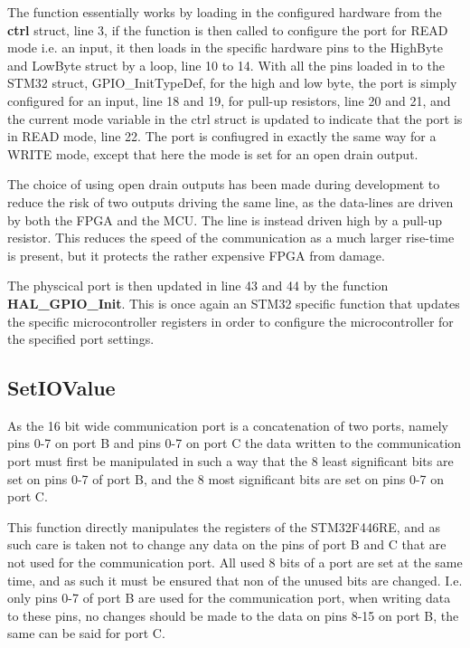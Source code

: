 The function essentially works by loading in the configured hardware from the \textbf{ctrl} struct, line 3, if the function is then called to configure the port for READ mode i.e. an input, it then loads in the specific hardware pins to the HighByte and LowByte struct by a loop, line 10 to 14. With all the pins loaded in to the STM32 struct, GPIO\_InitTypeDef, for the high and low byte, the port is simply configured for an input, line 18 and 19, for pull-up resistors, line 20 and 21, and the current mode variable in the ctrl struct is updated to indicate that the port is in READ mode, line 22. The port is confiugred in exactly the same way for a WRITE mode, except that here the mode is set for an open drain output.

The choice of using open drain outputs has been made during development to reduce the risk of two outputs driving the same line, as the data-lines are driven by both the FPGA and the MCU. The line is instead driven high by a pull-up resistor. This reduces the speed of the communication as a much larger rise-time is present, but it protects the rather expensive FPGA from damage.

The physcical port is then updated in line 43 and 44 by the function \textbf{HAL\_GPIO\_Init}. This is once again an STM32 specific function that updates the specific microcontroller registers in order to configure the microcontroller for the specified port settings.

\subsection*{SetIOValue}
As the 16 bit wide communication port is a concatenation of two ports, namely pins 0-7 on port B and pins 0-7 on port C the data written to the communication port must first be manipulated in such a way that the 8 least significant bits are set on pins 0-7 of port B, and the 8 most significant bits are set on pins 0-7 on port C.

This function directly manipulates the registers of the STM32F446RE, and as such care is taken not to change any data on the pins of port B and C that are not used for the communication port. All used 8 bits of a port are set at the same time, and as such it must be ensured that non of the unused bits are changed. I.e. only pins 0-7 of port B are used for the communication port, when writing data to these pins, no changes should be made to the data on pins 8-15 on port B, the same can be said for port C.

